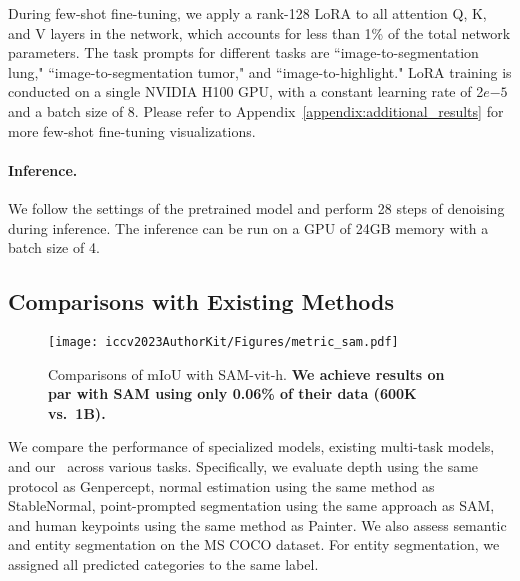During few-shot fine-tuning, we apply a
rank-128 
LoRA to all attention Q, K, and V layers in the network, which accounts for less than 1\% of the total network parameters. The task prompts for different tasks are ``im\-a\-ge-to-seg\-men\-ta\-ti\-on lung," ``im\-a\-ge-to-seg\-men\-ta\-ti\-on tumor," and ``ima\-ge-to-high\-li\-gh\-t." 
LoRA training is conducted on a single NVIDIA H100 GPU, with a constant learning rate of 2$e$$-5$ and a batch size of 8. Please refer to Appendix~\ref{appendix:additional_results} for more few-shot fine-tuning visualizations.

\vspace{-3mm}
\paragraph{Inference.}
We follow the settings of the pretrained model and perform 28 steps of denoising during inference. The inference can be run on a  GPU of 24GB memory with a batch size of 4.

\subsection{Comparisons with Existing Methods}





\begin{figure*}[htbp]
  \centering
  \texttt{[image: iccv2023AuthorKit/Figures/metric\_sam.pdf]}
  \caption{
   Comparisons of mIoU with SAM-vit-h. \textbf{We achieve results on par with SAM using only 0.06\% of their data (600K vs.\  1B).}
  }
  \label{fig:metric_sam}
\end{figure*}
We compare the performance of specialized models, existing multi-task models, and our \ours\ across various tasks. Specifically, we evaluate depth using the same protocol as Genpercept, normal estimation using the same method as StableNormal, point-prompted segmentation using the same approach as SAM, and human keypoints using the same method as Painter. We also assess semantic and entity segmentation on the MS COCO dataset. For entity segmentation, we assigned all predicted categories to the same label. 



